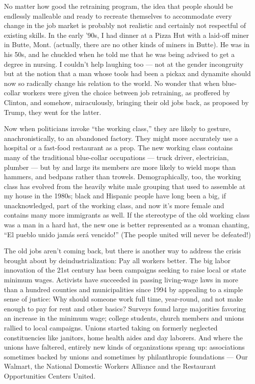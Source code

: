 No matter how good the retraining program, the idea that people should
be endlessly malleable and ready to recreate themselves to accommodate
every change in the job market is probably not realistic and certainly
not respectful of existing skills. In the early '90s, I had dinner at a
Pizza Hut with a laid-off miner in Butte, Mont. (actually, there are no
other kinds of miners in Butte). He was in his 50s, and he chuckled when
he told me that he was being advised to get a degree in nursing. I
couldn't help laughing too --- not at the gender incongruity but at the
notion that a man whose tools had been a pickax and dynamite should now
so radically change his relation to the world. No wonder that when
blue-collar workers were given the choice between job retraining, as
proffered by Clinton, and somehow, miraculously, bringing their old jobs
back, as proposed by Trump, they went for the latter.

Now when politicians invoke ``the working class,'' they are likely to
gesture, anachronistically, to an abandoned factory. They might more
accurately use a hospital or a fast-food restaurant as a prop. The new
working class contains many of the traditional blue-collar occupations
--- truck driver, electrician, plumber --- but by and large its members
are more likely to wield mops than hammers, and bedpans rather than
trowels. Demographically, too, the working class has evolved from the
heavily white male grouping that used to assemble at my house in the
1980s; black and Hispanic people have long been a big, if
unacknowledged, part of the working class, and now it's more female and
contains many more immigrants as well. If the stereotype of the old
working class was a man in a hard hat, the new one is better represented
as a woman chanting, ``El pueblo unido jamás será vencido!'' (The people
united will never be defeated!)

The old jobs aren't coming back, but there is another way to address the
crisis brought about by deindustrialization: Pay all workers better. The
big labor innovation of the 21st century has been campaigns seeking to
raise local or state minimum wages. Activists have succeeded in passing
living-wage laws in more than a hundred counties and municipalities
since 1994 by appealing to a simple sense of justice: Why should someone
work full time, year-round, and not make enough to pay for rent and
other basics? Surveys found large majorities favoring an increase in the
minimum wage; college students, church members and unions rallied to
local campaigns. Unions started taking on formerly neglected
constituencies like janitors, home health aides and day laborers. And
where the unions have faltered, entirely new kinds of organizations
sprang up: associations sometimes backed by unions and sometimes by
philanthropic foundations --- Our Walmart, the National Domestic Workers
Alliance and the Restaurant Opportunities Centers United.

